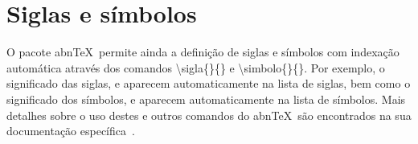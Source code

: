 \section{Siglas e s\'imbolos}

O pacote abn\TeX\ permite ainda a defini\c{c}\~ao de siglas e s\'imbolos com indexa\c{c}\~ao autom\'atica atrav\'es dos comandos {\ttfamily \textbackslash sigla\{\}\{\}} e {\ttfamily \textbackslash simbolo\{\}\{\}}. Por exemplo, o significado das siglas, e aparecem automaticamente na lista de siglas, bem como o significado dos s\'imbolos, e aparecem automaticamente na lista de s\'imbolos. Mais detalhes sobre o uso destes e outros comandos do abn\TeX\ s\~ao encontrados na sua documenta\c{c}\~ao espec\'ifica~\cite{abnTeX2009}.
